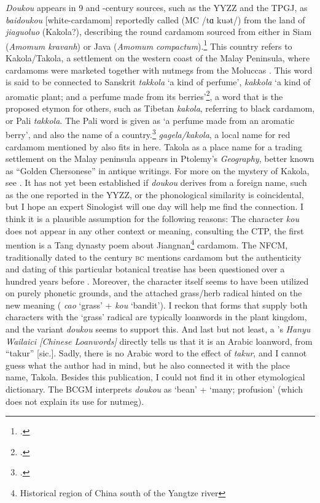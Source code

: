\textit{Doukou} appears in 9 and -century sources, such as the \gls{YYZZ} and the \gls{TPGJ}, as  \textit{baidoukou} [white-cardamom] reportedly called  (\gls{MC} /tɑ kuət/) from the land of  \textit{jiaguoluo} (Kakola?), describing the round cardamom sourced from either in Siam (\textit{Amomum kravanh}) or Java (\textit{Amomum compactum}).\footcite[18:55]{yyzz} This country refers to Kakola/Takola, a settlement on the western coast of the Malay Peninsula, where cardamoms were marketed together with nutmegs from the Moluccas \autocite[22]{donkin_between_2003}. This word is said to be connected to Sanskrit  \textit{takkola} `a kind of perfume',  \textit{kakkola} `a kind of aromatic plant; and a perfume made from its berries'\footcite[431,241]{monier-williams_sanskrit-english_1899}, a word that is the proposed etymon for others, such as Tibetan  
\textit{kakola}, referring to black cardamom, or Pali \textit{takkola}. The Pali word is given as `a perfume made from an aromatic berry', and also the name of a country.\footcites[292]{pali_text_society_pali_1921}[59]{trenckner_pali_1879}  \textit{gagela/kakola}, a local name for red cardamom mentioned by \textcite{hu_food_2005} also fits in here. Takola as a place name for a trading settlement on the Malay peninsula appears in Ptolemy's \textit{Geography}, better known as ``Golden Chersonese'' in antique writings. For more on the mystery of Kakola, see \textcite{wheatley_golden_1961}. It has not yet been established if \textit{doukou} derives from a foreign name, such as the one reported in the \gls{YYZZ}, or the phonological similarity is coincidental, but I hope an expert Sinologist will one day will help me find the connection. I think it is a plausible assumption for the following reasons: The character  \textit{kou} does not appear in any other context or meaning, consulting the \gls{CTP}, the first mention is a Tang dynasty poem about Jiangnan\footnote{Historical region of China south of the Yangtze river} cardamom. The \gls{NFCM}, traditionally dated to the  century \textsc{bc} mentions cardamom but the authenticity and dating of this particular botanical treatise has been questioned over a hundred years before \autocite{ma_authenticity_1978}. Moreover, the character itself seems to have been utilized on purely phonetic grounds, and the attached grass/herb radical hinted on the new meaning ( \textit{cao} `grass' +  \textit{kou} `bandit'). I reckon that forms that supply both characters with the `grass' radical are typically loanwords in the plant kingdom, and the variant  \textit{doukou} seems to support this. And last but not least, a \textcite[40]{shi_hanyu_2000}'s \textit{Hanyu Wailaici [Chinese Loanwords]} directly tells us that it is an Arabic loanword, from ``takur'' [sic.]. Sadly, there is no Arabic word to the effect of \textit{takur}, and I cannot guess what the author had in mind, but he also connected it with the place name, Takola. Besides this publication, I could not find it in other etymological dictionary. The \gls{BCGM} interprets \textit{doukou} as `bean' + `many; profusion' (which does not explain its use for nutmeg).

